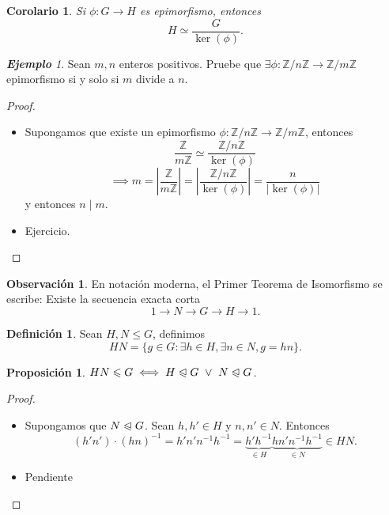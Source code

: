 \documentclass{article}
\newtheorem{corollary}[theorem]{Corolario}
\newtheorem{proposition}[theorem]{Proposición}
\theoremstyle{definition}
\newtheorem{definition}[theorem]{Definición}
\newtheorem*{obs}{Observación}
\theoremstyle{remark}
\newtheorem{example}[theorem]{\textbf{Ejemplo}}
\numberwithin{equation}{section}
\newcommand{\Z}{\mathbb{Z}}
\renewcommand{\c}{\cdot}
\newcommand{\normal}{\trianglelefteqslant}
\newcommand{\abs}[1]{\left| #1 \right|}
\newcommand{\znz}[1]{\frac{\Z}{#1 \Z}}
\newcommand{\zmz}[1]{\Z/ #1 \Z}
\newcommand{\rac}[2]{\frac{#1}{#2}}
\begin{document}
\begin{corollary}
  Si $\phi \colon G \to H$ es epimorfismo, entonces $$H \simeq \rac{G}{\ker(\phi)}.$$
\end{corollary}

\begin{example}
  Sean $m,n$ enteros positivos. Pruebe que $\exists \phi \colon \zmz n \to \zmz m$ epimorfismo si y solo si $m$ divide a $n$.
\end{example}
\begin{proof}\
  \begin{itemize}
    \item[\boxed{\implies}] Supongamos que existe un epimorfismo $\phi \colon \zmz n \to \zmz m$, entonces
    \[\znz m \simeq \frac{\zmz n}{\ker(\phi)}\]
    \[\implies m
    = \abs{\znz m}
    = \abs{ \frac{\zmz n}{\ker(\phi)} }
    = \frac{n}{\abs{\ker(\phi)}}\]
    y entonces $n \mid m$.

    \item[\boxed{\impliedby}] Ejercicio. %
  \end{itemize}
\end{proof}

\begin{obs}
  En notación moderna, el Primer Teorema de Isomorfismo se escribe: Existe la secuencia exacta corta
  \[1 \to N \to G \to H \to 1.\] %
\end{obs}

\begin{definition}
  Sean $H,N \leqslant G$, definimos
  \[HN = \{g \in G : \exists h \in H, \exists n \in N, g = hn\}.\]
\end{definition}

\begin{proposition}
  $HN \leqslant G \iff H \normal G \ \lor\ N \normal G$.
\end{proposition}
\begin{proof}
  \
  \begin{itemize}
    \item[\boxed{\impliedby}]
    Supongamos que $N \normal G$. Sean $h,h' \in H$ y $n,n' \in N$. Entonces
    \[(h'n') \c (hn)^{-1}
    = h' n' n^{-1} h^{-1}
    = \underbrace{h' h^{-1}}_{\in H} \underbrace{h n' n^{-1} h^{-1}}_{\in N} \in HN.\]
    \item[\boxed{\implies}] Pendiente %
  \end{itemize}
\end{proof}
\end{document}
